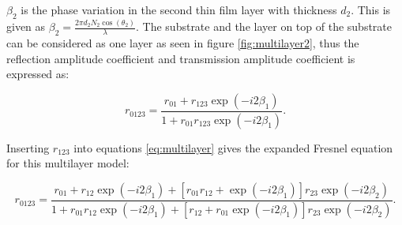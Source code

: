 \documentclass[MasterThesisMain.tex]{subfiles}
\begin{document}
$\beta_2$ is the phase variation in the second thin film layer with thickness $d_2$. This is given as $\beta_2=\frac{2\pi d_2N_2\cos(\theta_2)}{\lambda}$. The substrate and the layer on top of the substrate can be considered as one layer as seen in figure \ref{fig:multilayer2}, thus the reflection amplitude coefficient and transmission amplitude coefficient is expressed as:         

\begin{equation}\label{eq:multilayer}
r_{0123}= \frac{r_{01}+r_{123}\exp(-i2\beta_1)}{1+r_{01}r_{123}\exp(-i2\beta_1)}.
\end{equation}

Inserting $r_{123}$ into equations \ref{eq:multilayer} gives the expanded Fresnel equation for this multilayer model:

\begin{equation}
r_{0123} = \frac{r_{01}+r_{12}\exp(-i2\beta_1)+[r_{01}r_{12}+\exp(-i2\beta_1)]r_{23}\exp(-i2\beta_2)}{1+r_{01}r_{12}\exp(-i2\beta_1)+[r_{12}+r_{01}\exp(-i2\beta_1)]r_{23}\exp(-i2\beta_2)}.
\end{equation}

%
 
\end{document}

